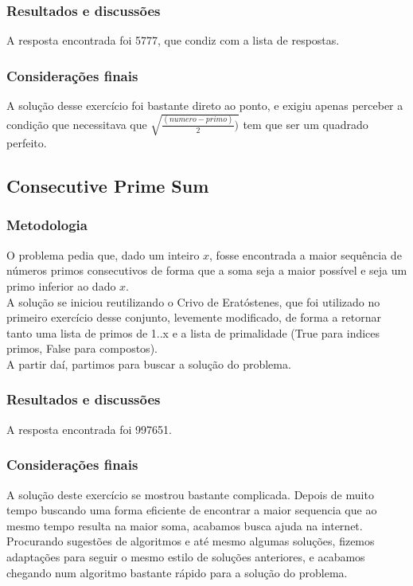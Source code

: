 \documentclass{article}
\begin{document}
        \subsubsection{Resultados e discussões}
        A resposta encontrada foi 5777, que condiz com a lista de respostas.
        
        \subsubsection{Considerações finais}
        A solução desse exercício foi bastante direto ao ponto, e exigiu apenas perceber a condição que necessitava que $\sqrt{\frac{(numero - primo)}{2})}$ tem que ser um quadrado perfeito.
        
    \subsection{Consecutive Prime Sum}
        
        \subsubsection{Metodologia}
        O problema pedia que, dado um inteiro $x$, fosse encontrada a maior sequência de números primos consecutivos de forma que a soma seja a maior possível e seja um primo inferior ao dado $x$.\\
        A solução se iniciou reutilizando o Crivo de Eratóstenes, que foi utilizado no primeiro exercício desse conjunto, levemente modificado, de forma a retornar tanto uma lista de primos de 1..x e a lista de primalidade (True para indices primos, False para compostos).\\
        A partir daí, partimos para buscar a solução do problema.
        
        \subsubsection{Resultados e discussões}
        A resposta encontrada foi 997651.
        
        \subsubsection{Considerações finais}
        A solução deste exercício se mostrou bastante complicada. Depois de muito tempo buscando uma forma eficiente de encontrar a maior sequencia que ao mesmo tempo resulta na maior soma, acabamos busca ajuda na internet.\\
        Procurando sugestões de algoritmos e até mesmo algumas soluções, fizemos adaptações para seguir o mesmo estilo de soluções anteriores, e acabamos chegando num algoritmo bastante rápido para a solução do problema.
\end{document}
